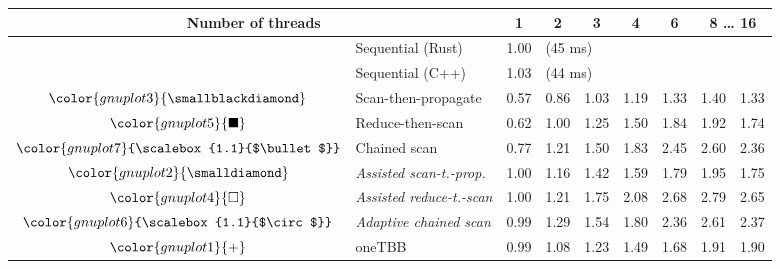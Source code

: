 \begin{tabular}{clrrrrrrr}
\toprule
\multicolumn{2}{c}{\textbf{Number of threads}} & \multicolumn{1}{c}{\textbf{ 1 }} & \multicolumn{1}{c}{\textbf{ 2 }} & \multicolumn{1}{c}{\textbf{ 3 }} & \multicolumn{1}{c}{\textbf{ 4 }} & \multicolumn{1}{c}{\textbf{ 6 }} & \multicolumn{2}{c}{\textbf{ 8 } \dots \textbf{ 16 }} \\
\midrule
& Sequential (Rust) & \multicolumn{1}{r}{ 1.00 } & \multicolumn{ 6 }{l}{(45 ms)} \\
& Sequential (C++) & \multicolumn{1}{r}{ 1.03 } & \multicolumn{ 6 }{l}{(44 ms)} \\
\rowcolor{gnuplot3!10}$\color{gnuplot3}{\smallblackdiamond}$ & Scan-then-propagate & \cellcolor{gnuplot3!10} 0.57 & \cellcolor{gnuplot3!10} 0.86 & \cellcolor{gnuplot3!10} 1.03 & \cellcolor{gnuplot3!10} 1.19 & \cellcolor{gnuplot3!10} 1.33 & \cellcolor{gnuplot3!10} 1.40 & \cellcolor{gnuplot3!10} 1.33 \\
\rowcolor{gnuplot5!10}$\color{gnuplot5}{\blacksquare}$ & Reduce-then-scan & \cellcolor{gnuplot5!10} 0.62 & \cellcolor{gnuplot5!10} 1.00 & \cellcolor{gnuplot5!10} 1.25 & \cellcolor{gnuplot5!10} 1.50 & \cellcolor{gnuplot5!10} 1.84 & \cellcolor{gnuplot5!10} 1.92 & \cellcolor{gnuplot5!10} 1.74 \\
\rowcolor{gnuplot7!10}$\color{gnuplot7}{\scalebox{1.1}{$\bullet$}}$ & Chained scan & \cellcolor{gnuplot7!10} 0.77 & \cellcolor{gnuplot7!10} 1.21 & \cellcolor{gnuplot7!10} 1.50 & \cellcolor{gnuplot7!10} 1.83 & \cellcolor{gnuplot7!10} 2.45 & \cellcolor{gnuplot7!10} 2.60 & \cellcolor{gnuplot7!10} 2.36 \\
\rowcolor{gnuplot2!30}$\color{gnuplot2}{\smalldiamond}$ & \textit{Assisted scan-t.-prop.} & \cellcolor{gnuplot2!30} 1.00 & \cellcolor{gnuplot2!30} 1.16 & \cellcolor{gnuplot2!30} 1.42 & \cellcolor{gnuplot2!30} 1.59 & \cellcolor{gnuplot2!30} 1.79 & \cellcolor{gnuplot2!30} 1.95 & \cellcolor{gnuplot2!30} 1.75 \\
\rowcolor{gnuplot4!30}$\color{gnuplot4}{\square}$ & \textit{Assisted reduce-t.-scan} & \cellcolor{gnuplot4!30} 1.00 & \cellcolor{gnuplot4!30} 1.21 & \cellcolor{gnuplot4!30} 1.75 & \cellcolor{gnuplot4!30} 2.08 & \cellcolor{gnuplot4!30} 2.68 & \cellcolor{gnuplot4!30} 2.79 & \cellcolor{gnuplot4!30} 2.65 \\
\rowcolor{gnuplot6!30}$\color{gnuplot6}{\scalebox{1.1}{$\circ$}}$ & \textit{Adaptive chained scan} & \cellcolor{gnuplot6!30} 0.99 & \cellcolor{gnuplot6!30} 1.29 & \cellcolor{gnuplot6!30} 1.54 & \cellcolor{gnuplot6!30} 1.80 & \cellcolor{gnuplot6!30} 2.36 & \cellcolor{gnuplot6!30} 2.61 & \cellcolor{gnuplot6!30} 2.37 \\
\rowcolor{gnuplot1!10}$\color{gnuplot1}{+}$ & oneTBB & \cellcolor{gnuplot1!10} 0.99 & \cellcolor{gnuplot1!10} 1.08 & \cellcolor{gnuplot1!10} 1.23 & \cellcolor{gnuplot1!10} 1.49 & \cellcolor{gnuplot1!10} 1.68 & \cellcolor{gnuplot1!10} 1.91 & \cellcolor{gnuplot1!10} 1.90 \\
\bottomrule
\end{tabular}
